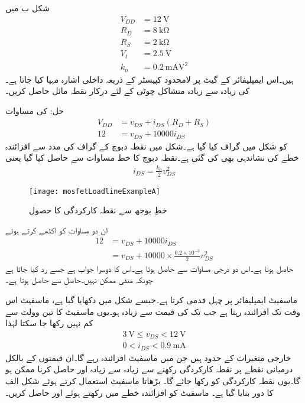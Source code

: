 شکل  ب میں
\begin{align*}
V_{DD}&=\SI{12}{\volt}\\
R_D&=\SI{8}{\kilo \ohm}\\
R_S&=\SI{2}{\kilo \ohm}\\
V_t&=\SI{2.5}{\volt}\\
k_n&=\SI{0.2}{\milli \ampere \volt \squared}
\end{align*}
ہیں۔اس ایمپلیفائر کے گیٹ پر لامحدود کپیسٹر کے ذریعہ داخلی اشارہ مہیا کیا جاتا ہے۔ کی زیادہ سے زیادہ  متشاکل چوٹی کے لئے درکار نقطہ مائل حاصل کریں۔

حل: کی مساوات 
\begin{align*}
V_{DD}&=v_{DS}+i_{DS}\left(R_D+R_S \right)\\
12&=v_{DS}+10000 i_{DS}
\end{align*}
کو شکل  میں گراف کیا گیا ہے۔شکل میں نقطہ دبوچ کے گراف کی مدد سے افزائندہ خطے کی نشاندہی بھی  کی گئی ہے۔نقطہ  دبوچ کا خط مساوات  سے حاصل کیا گیا یعنی 
\begin{align*}
i_{DS}=\tfrac{k_n}{2} v_{DS}^2
\end{align*}
%
\begin{figure}
\centering
\texttt{[image: mosfetLoadlineExampleA]}
\caption{خطِ بوجھ سے نقطہ کارکردگی کا حصول }
\label{شکل_ماسفیٹ_بار_کا_خط_سے_نقطہ _کارکردگی_الف}
\end{figure}

ان دو مساوات کو اکٹھے کرتے  ہوئے
\begin{align*}
12&=v_{DS}+10000 i_{DS}\\
&=v_{DS}+10000 \times \frac{0.2 \times 10^{-3}}{2} v_{DS}^2
\end{align*}
حاصل ہوتا ہے۔اس دو درجی مساوات سے  حاصل ہوتا ہے۔اس کا دوسرا جواب  ہے جسے رد کیا جاتا ہے چونکہ  منفی ممکن نہیں۔حاصل  سے  حاصل ہوتا ہے۔

ماسفیٹ ایمپلیفائر  پر چہل قدمی کرتا ہے۔جیسے شکل میں دکھایا گیا ہے، ماسفیٹ اس وقت تک افزائندہ رہتا ہے جب تک   کی قیمت سے زیادہ ہو۔یوں ماسفیٹ کا  تین وولٹ سے کم نہیں رکھا جا سکتا لہٰذا
\begin{align*}
\SI{3}{\volt} \le v_{DS} < \SI{12}{\volt}\\
0 < i_{DS} < \SI{0.9}{\milli \ampere}
\end{align*}
خارجی متغیرات کے حدود ہیں جن میں ماسفیٹ افزائندہ رہے گا۔ان قیمتوں کے بالکل درمیانی نقطے پر نقطہ کارکردگی رکھنے سے زیادہ سے زیادہ  اور  حاصل کرنا ممکن ہو گا۔یوں نقطہ کارکردگی کو   رکھا جائے گا۔
 بڑھاتا ماسفیٹ استعمال کرتے ہوئے شکل   الف  کا دور بنایا گیا ہے۔ ماسفیٹ کو افزائندہ خطے میں رکھتے ہوئے  اور  حاصل کریں۔

